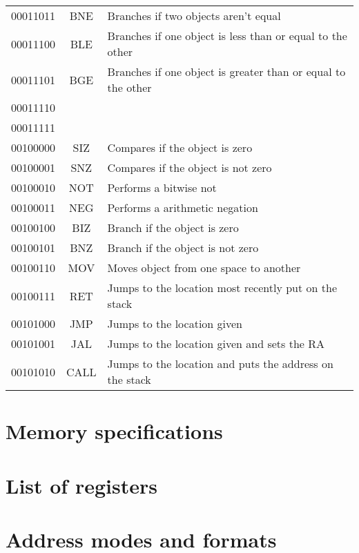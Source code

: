 \documentclass[12pt]{article}
\begin{document}
\begin{tabular}{| r | c | l |}
00011011 & BNE & Branches if two objects aren't equal\\
00011100 & BLE & Branches if one object is less than or equal to the other\\
00011101 & BGE & Branches if one object is greater than or equal to the other\\
00011110 & &\\
00011111 & &\\
00100000 & SIZ & Compares if the object is zero\\
00100001 & SNZ & Compares if the object is not zero\\
00100010 & NOT & Performs a bitwise not\\
00100011 & NEG & Performs a arithmetic negation\\
00100100 & BIZ & Branch if the object is zero\\
00100101 & BNZ & Branch if the object is not zero\\
00100110 & MOV & Moves object from one space to another\\
00100111 & RET & Jumps to the location most recently put on the stack\\
00101000 & JMP & Jumps to the location given\\
00101001 & JAL & Jumps to the location given and sets the RA\\
00101010 & CALL & Jumps to the location and puts the address on the stack\\

\hline
\end{tabular}

\section{Memory specifications}

\section{List of registers}

\section{Address modes and formats}
\end{document}
